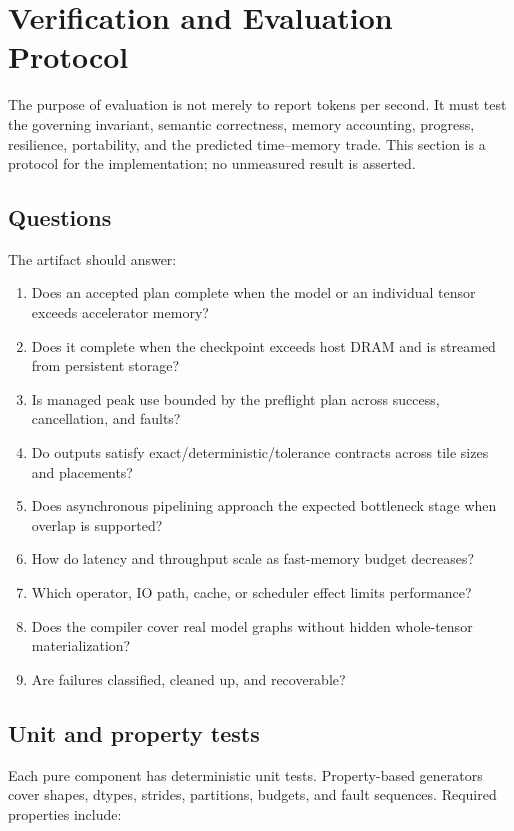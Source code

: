 \section{Verification and Evaluation Protocol}
\label{sec:verification}

The purpose of evaluation is not merely to report tokens per second. It must test the governing invariant, semantic correctness, memory accounting, progress, resilience, portability, and the predicted time--memory trade. This section is a protocol for the implementation; no unmeasured result is asserted.

\subsection{Questions}

The artifact should answer:

\begin{enumerate}
  \item Does an accepted plan complete when the model or an individual tensor exceeds accelerator memory?
  \item Does it complete when the checkpoint exceeds host DRAM and is streamed from persistent storage?
  \item Is managed peak use bounded by the preflight plan across success, cancellation, and faults?
  \item Do outputs satisfy exact/deterministic/tolerance contracts across tile sizes and placements?
  \item Does asynchronous pipelining approach the expected bottleneck stage when overlap is supported?
  \item How do latency and throughput scale as fast-memory budget decreases?
  \item Which operator, IO path, cache, or scheduler effect limits performance?
  \item Does the compiler cover real model graphs without hidden whole-tensor materialization?
  \item Are failures classified, cleaned up, and recoverable?
\end{enumerate}

\subsection{Unit and property tests}

Each pure component has deterministic unit tests. Property-based generators cover shapes, dtypes, strides, partitions, budgets, and fault sequences. Required properties include:

